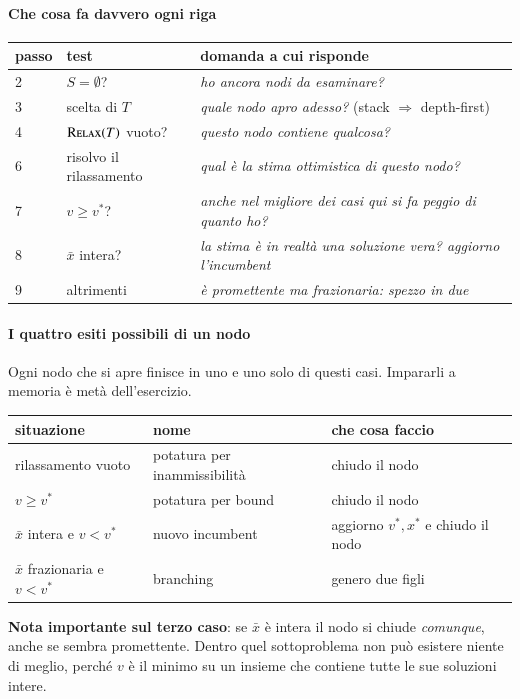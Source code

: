 \documentclass[12pt]{extarticle} %
\begin{document}
\paragraph{Che cosa fa davvero ogni riga}
\begin{center}
\begin{tabular}{lll}
\hline
\textbf{passo} & \textbf{test} & \textbf{domanda a cui risponde} \\
\hline
2 & $S = \emptyset$? & \emph{ho ancora nodi da esaminare?} \\
3 & scelta di $T$ & \emph{quale nodo apro adesso?} (stack $\Rightarrow$ depth-first) \\
4 & $\textsc{Relax}(T)$ vuoto? & \emph{questo nodo contiene qualcosa?} \\
6 & risolvo il rilassamento & \emph{qual è la stima ottimistica di questo nodo?} \\
7 & $v \ge v^*$? & \emph{anche nel migliore dei casi qui si fa peggio di quanto ho?} \\
8 & $\bar{x}$ intera? & \emph{la stima è in realtà una soluzione vera? aggiorno l'incumbent} \\
9 & altrimenti & \emph{è promettente ma frazionaria: spezzo in due} \\
\hline
\end{tabular}
\end{center}

\paragraph{I quattro esiti possibili di un nodo}
Ogni nodo che si apre finisce in uno e uno solo di questi casi. Impararli a memoria è metà dell'esercizio.
\begin{center}
\begin{tabular}{lll}
\hline
\textbf{situazione} & \textbf{nome} & \textbf{che cosa faccio} \\
\hline
rilassamento vuoto & potatura per inammissibilità & chiudo il nodo \\
$v \ge v^*$ & potatura per bound & chiudo il nodo \\
$\bar{x}$ intera e $v < v^*$ & nuovo incumbent & aggiorno $v^*,x^*$ e chiudo il nodo \\
$\bar{x}$ frazionaria e $v < v^*$ & branching & genero due figli \\
\hline
\end{tabular}
\end{center}
\textbf{Nota importante sul terzo caso}: se $\bar{x}$ è intera il nodo si chiude \emph{comunque}, anche se sembra promettente. Dentro quel sottoproblema non può esistere niente di meglio, perché $v$ è il minimo su un insieme che contiene tutte le sue soluzioni intere.
\end{document}
